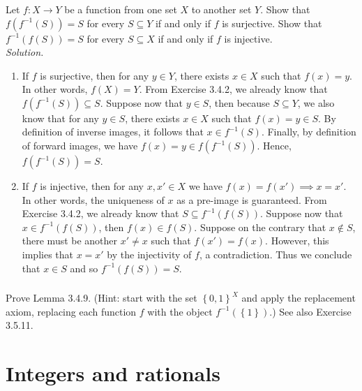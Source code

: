 \documentclass{amsart}
\theoremstyle{definition}
\newcommand{\set}[1]{\left\{#1\right\}}
\begin{document}
\subsubsection{}  Let $f:X\to Y$ be a function from one set $X$ to another set $Y$. Show that $f(f^{-1}(S))=S$ for every $S\subseteq Y$ if and only if $f$ is surjective. Show that $f^{-1}(f(S))=S$ for every $S\subseteq X$ if and only if $f$ is injective. \\

\textit{Solution.}
\begin{enumerate} 
\item If $f$ is surjective, then for any $y\in Y$, there exists $x\in X$ such that $f(x)=y$. In other words, $f(X)=Y$. From Exercise 3.4.2, we already know that $f(f^{-1}(S))\subseteq S$. Suppose now that $y\in S$, then because $S\subseteq Y$, we also know that for any $y\in S$, there exists $x\in X$ such that $f(x)=y\in S$. By definition of inverse images, it follows that $x\in f^{-1}(S)$. Finally, by definition of forward images, we have $f(x)=y\in f(f^{-1}(S))$. Hence, $f(f^{-1}(S))=S$. \\

\item If $f$ is injective, then for any $x,x'\in X$ we have $f(x)=f(x')\implies x=x'$. In other words, the uniqueness of $x$ as a pre-image is guaranteed. From Exercise 3.4.2, we already know that $S\subseteq f^{-1}(f(S))$. Suppose now that $x\in f^{-1}(f(S))$, then $f(x)\in f(S)$. Suppose on the contrary that $x\notin S$, there must be another $x'\neq x$ such that $f(x')=f(x)$. However, this implies that $x=x'$ by the injectivity of $f$, a contradiction. Thus we conclude that $x\in S$ and so $f^{-1}(f(S))=S$. \\
\end{enumerate}


\subsubsection{} Prove Lemma 3.4.9. (Hint: start with the set $\set{0,1}^X$ and apply the replacement axiom, replacing each function $f$ with the object $f^{-1}(\set{1})$.) See also Exercise 3.5.11.








\newpage
\section{Integers and rationals}
\end{document}

